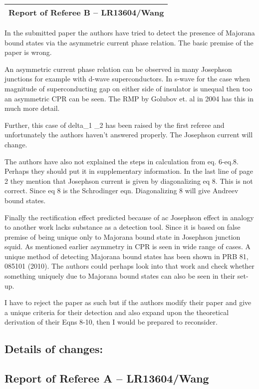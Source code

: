 \documentclass[11pt]{article}
\begin{document}
\begin{longtable}[]{@{}l@{}}
\toprule
\endhead
Report of Referee B -- LR13604/Wang\tabularnewline
\bottomrule
\end{longtable}

In the submitted paper the authors have tried to detect the presence of
Majorana bound states via the asymmetric current phase relation. The
basic premise of the paper is wrong.

An asymmetric current phase relation can be observed in many Josephson
junctions for example with d-wave superconductors. In s-wave for the
case when magnitude of superconducting gap on either side of insulator
is unequal then too an asymmetric CPR can be seen. The RMP by Golubov
et. al in 2004 has this in much more detail.

Further, this case of delta\_1 \neq \delta\_2 has been raised by the
first referee and unfortunately the authors haven't answered properly.
The Josephson current will change.

The authors have also not explained the steps in calculation from eq.
6-eq.8. Perhaps they should put it in supplementary information. In the
last line of page 2 they mention that Josephson current is given by
diagonalizing eq 8. This is not correct. Since eq 8 is the Schrodinger
eqn. Diagonalizing 8 will give Andreev bound states.

Finally the rectification effect predicted because of ac Josephson
effect in analogy to another work lacks substance as a detection tool.
Since it is based on false premise of being unique only to Majorana
bound state in Josephson junction squid. As mentioned earlier asymmetry
in CPR is seen in wide range of cases. A unique method of detecting
Majorana bound states has been shown in PRB 81, 085101 (2010). The
authors could perhaps look into that work and check whether something
uniquely due to Majorana bound states can also be seen in their set-up.

I have to reject the paper as such but if the authors modify their paper
and give a unique criteria for their detection and also expand upon the
theoretical derivation of their Eqns 8-10, then I would be prepared to
reconsider.

\hypertarget{details-of-changes}{%
\subsection{Details of changes:}\label{details-of-changes}}

\hypertarget{report-of-referee-a-lr13604wang}{%
\subsection{Report of Referee A --
LR13604/Wang}\label{report-of-referee-a-lr13604wang}}
\end{document}
